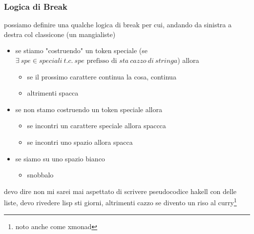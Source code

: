 \documentclass[11pt]{article}
\begin{document}
\subsubsection{Logica di Break}
\label{sec:orgf85d3a6}
possiamo definire una qualche logica di break per cui, andando da sinistra a destra col classicone (un mangialiste)
\begin{itemize}
\item se stiamo "costruendo" un token speciale (se \(\exists\ spe \in speciali\ t.c.\ spe \text{ prefisso di } sta\ cazzo\ di\ stringa\)) allora
\begin{itemize}
\item se il prossimo carattere continua la cosa, continua
\item altrimenti spacca
\end{itemize}
\item se non stamo costruendo un token speciale allora
\begin{itemize}
\item se incontri un carattere speciale allora spaccca
\item se incontri uno spazio allora spacca
\end{itemize}
\item se siamo su uno spazio bianco
\begin{itemize}
\item snobbalo
\end{itemize}
\end{itemize}

devo dire non mi sarei mai aspettato di scrivere pseudocodice hakell con delle liste,
devo rivedere lisp sti giorni, altrimenti cazzo se divento un riso al curry\footnote{noto anche come xmonad}
\end{document}
